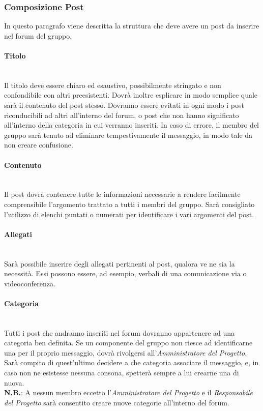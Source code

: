 \subsubsection{Composizione Post}
In questo paragrafo viene descritta la struttura che deve avere un post da inserire nel forum del gruppo.

\paragraph{Titolo}\mbox{}\\
Il titolo deve essere chiaro ed esaustivo, possibilmente stringato e non confondibile con altri preesistenti. Dovrà inoltre esplicare in modo semplice quale sarà il contenuto del post stesso. Dovranno essere evitati in ogni modo i post riconducibili ad altri all'interno del forum, o post che non hanno significato all'interno della categoria in cui verranno inseriti. In caso di errore, il membro del gruppo sarà tenuto ad eliminare tempestivamente il messaggio, in modo tale da non creare confusione.

\paragraph{Contenuto}\mbox{}\\
Il post dovrà contenere tutte le informazioni necessarie a rendere facilmente comprensibile l'argomento trattato a tutti i membri del gruppo.
Sarà consigliato l'utilizzo di elenchi puntati o numerati per identificare i vari argomenti del post.

\paragraph{Allegati}\mbox{}\\
Sarà possibile inserire degli allegati pertinenti al post, qualora ve ne sia la necessità. Essi possono essere, ad esempio, verbali di una comunicazione via  o videoconferenza.

\paragraph{Categoria}\mbox{}\\
Tutti i post che andranno inseriti nel forum dovranno appartenere ad una categoria ben definita. Se un componente del gruppo non riesce ad identificarne una per il proprio messaggio, dovrà rivolgersi all'\textit{Amministratore del Progetto}. Sarà compito di quest'ultimo decidere a che categoria associare il messaggio, e, in caso non ne esistesse nessuna consona, spetterà sempre a lui crearne una di nuova. \\ 
\textbf{N.B.}: A nessun membro eccetto l'\textit{Amministratore del Progetto} e il \textit{Responsabile del Progetto} sarà consentito creare nuove categorie all'interno del forum.

